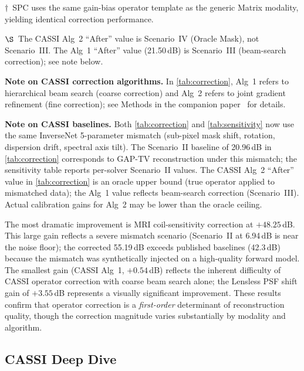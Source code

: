 {\footnotesize $\dagger$~SPC uses the same gain-bias operator template
as the generic Matrix modality, yielding identical correction
performance.}

\smallskip
{\footnotesize $\S$~The CASSI Alg~2 ``After'' value is Scenario~IV (Oracle Mask), not Scenario~III.  The Alg~1 ``After'' value (21.50\,dB) is Scenario~III (beam-search correction); see note below.}

\medskip
\noindent
\textbf{Note on CASSI correction algorithms.}
In \cref{tab:correction}, Alg~1 refers to hierarchical beam search (coarse correction) and Alg~2 refers to joint gradient refinement (fine correction); see Methods in the companion paper~\cite{yang2026inversenet} for details.

\medskip
\noindent
\textbf{Note on CASSI baselines.}
Both \cref{tab:correction} and \cref{tab:sensitivity} now use the same InverseNet 5-parameter mismatch (sub-pixel mask shift, rotation, dispersion drift, spectral axis tilt).  The Scenario~II baseline of 20.96\,dB in \cref{tab:correction} corresponds to GAP-TV reconstruction under this mismatch; the sensitivity table reports per-solver Scenario~II values.  The CASSI Alg~2 ``After'' value in \cref{tab:correction} is an oracle upper bound (true operator applied to mismatched data); the Alg~1 value reflects beam-search correction (Scenario~III).  Actual calibration gains for Alg~2 may be lower than the oracle ceiling.

\medskip
\noindent
The most dramatic improvement is MRI coil-sensitivity correction at
$+48.25$\,dB.  This large gain reflects a severe mismatch scenario
(Scenario~II at 6.94\,dB is near the noise floor); the corrected
55.19\,dB exceeds published baselines (42.3\,dB) because the mismatch
was synthetically injected on a high-quality forward model.
The smallest gain (CASSI Alg~1, $+0.54$\,dB) reflects the inherent difficulty of CASSI operator correction with coarse beam search alone; the Lensless PSF shift gain of $+3.55$\,dB represents a visually significant improvement.  These results confirm that operator correction is a \emph{first-order} determinant of
reconstruction quality, though the correction magnitude varies substantially by modality and algorithm.

\subsection{CASSI Deep Dive}
\label{subsec:cassi}

